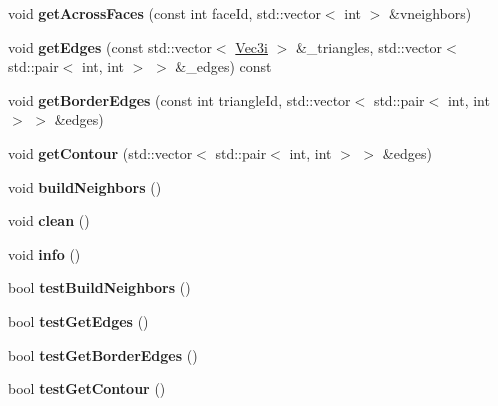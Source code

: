 \begin{DoxyCompactItemize}
\item 
\hypertarget{classhokusai_1_1TriMesh_a74571808736926d7e1da7c3f11da53a9}{void {\bfseries get\+Across\+Faces} (const int face\+Id, std\+::vector$<$ int $>$ \&vneighbors)}\label{classhokusai_1_1TriMesh_a74571808736926d7e1da7c3f11da53a9}

\item 
\hypertarget{classhokusai_1_1TriMesh_a463c7b3b3520229dcff9bf8dfbc26bb0}{void {\bfseries get\+Edges} (const std\+::vector$<$ \hyperlink{classhokusai_1_1Vec3}{Vec3i} $>$ \&\+\_\+triangles, std\+::vector$<$ std\+::pair$<$ int, int $>$ $>$ \&\+\_\+edges) const }\label{classhokusai_1_1TriMesh_a463c7b3b3520229dcff9bf8dfbc26bb0}

\item 
\hypertarget{classhokusai_1_1TriMesh_a2917bfb0b59ac20e9ff0cbb2d803a8eb}{void {\bfseries get\+Border\+Edges} (const int triangle\+Id, std\+::vector$<$ std\+::pair$<$ int, int $>$ $>$ \&edges)}\label{classhokusai_1_1TriMesh_a2917bfb0b59ac20e9ff0cbb2d803a8eb}

\item 
\hypertarget{classhokusai_1_1TriMesh_aae75e7386a67fd114e395998f0c5c8d8}{void {\bfseries get\+Contour} (std\+::vector$<$ std\+::pair$<$ int, int $>$ $>$ \&edges)}\label{classhokusai_1_1TriMesh_aae75e7386a67fd114e395998f0c5c8d8}

\item 
\hypertarget{classhokusai_1_1TriMesh_aea6b01075e022e37818987ff6801c398}{void {\bfseries build\+Neighbors} ()}\label{classhokusai_1_1TriMesh_aea6b01075e022e37818987ff6801c398}

\item 
\hypertarget{classhokusai_1_1TriMesh_a17fb8eb871e93c69135a062cf6eb3629}{void {\bfseries clean} ()}\label{classhokusai_1_1TriMesh_a17fb8eb871e93c69135a062cf6eb3629}

\item 
\hypertarget{classhokusai_1_1TriMesh_aa87d4cca81c424576e84583bd6928502}{void {\bfseries info} ()}\label{classhokusai_1_1TriMesh_aa87d4cca81c424576e84583bd6928502}

\item 
\hypertarget{classhokusai_1_1TriMesh_ad92f180199c07a0dccf14abb804efae6}{bool {\bfseries test\+Build\+Neighbors} ()}\label{classhokusai_1_1TriMesh_ad92f180199c07a0dccf14abb804efae6}

\item 
\hypertarget{classhokusai_1_1TriMesh_aa0730193838372e72b608b94de7dbd66}{bool {\bfseries test\+Get\+Edges} ()}\label{classhokusai_1_1TriMesh_aa0730193838372e72b608b94de7dbd66}

\item 
\hypertarget{classhokusai_1_1TriMesh_a4c27fe9bb62759960a561d0761e5233a}{bool {\bfseries test\+Get\+Border\+Edges} ()}\label{classhokusai_1_1TriMesh_a4c27fe9bb62759960a561d0761e5233a}

\item 
\hypertarget{classhokusai_1_1TriMesh_ac9c21797b8d15631bcc046d4a7d4bae3}{bool {\bfseries test\+Get\+Contour} ()}\label{classhokusai_1_1TriMesh_ac9c21797b8d15631bcc046d4a7d4bae3}

\end{DoxyCompactItemize}
